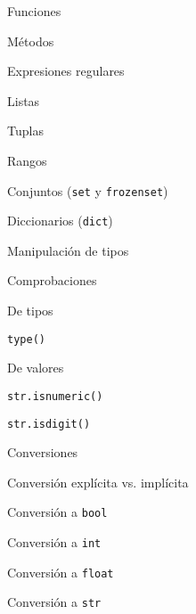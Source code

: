\begin{longenum}
\begin{longenum}
\begin{longenum}
\begin{longenum}
\begin{longenum}
\begin{longenum}
                    \end{longenum}
                    \item Funciones
                    \item Métodos
                    \item Expresiones regulares
                \end{longenum}
                \item Listas
                \item Tuplas
                \item Rangos
            \end{longenum}
            \item Conjuntos (\texttt{set} y \texttt{frozenset})
            \item Diccionarios (\texttt{dict})
        \end{longenum}
        \item Manipulación de tipos
        \begin{longenum}
            \item Comprobaciones
            \begin{longenum}
                \item De tipos
                \begin{longenum}
                    \item \texttt{type()}
                \end{longenum}
                \item De valores
                \begin{longenum}
                    \item \texttt{str.isnumeric()}
                    \item \texttt{str.isdigit()}
                \end{longenum}
            \end{longenum}
            \item Conversiones
            \begin{longenum}
                \item Conversión explícita vs. implícita
                \item Conversión a \texttt{bool}
                \item Conversión a \texttt{int}
                \item Conversión a \texttt{float}
                \item Conversión a \texttt{str}
            \end{longenum}

\end{longenum}
\end{longenum}
\end{longenum}
